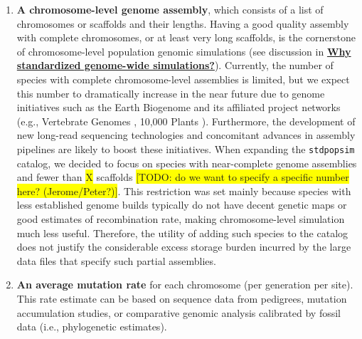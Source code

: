 \documentclass[hidelinks]{article}
\newcommand{\stdpopsim}{\texttt{stdpopsim}\xspace}
\begin{document}
\begin{enumerate}
\def\labelenumi{\arabic{enumi}.}
\item
  \textbf{A chromosome-level genome assembly}, which consists of a list of chromosomes or scaffolds and their lengths. Having a good quality assembly with complete chromosomes, or at least very long scaffolds, is the cornerstone of chromosome-level population genomic simulations (see discussion in \hyperref[sec:std-sim]{\textbf{Why standardized genome-wide simulations?}}). Currently, the number of species with complete chromosome-level assemblies is limited, but we expect this number to dramatically increase in the near future due to genome initiatives such as the Earth Biogenome \citep{Lewin2022} and its affiliated project networks (e.g.,
  Vertebrate Genomes \citep{Rhie2021}, 10,000 Plants \citep{Cheng2018}).
  Furthermore, the development of new long-read sequencing technologies
  \citep{Amarasinghe2020} and concomitant advances in assembly pipelines
  \citep{Chakraborty2016} are likely to boost these initiatives. When expanding the \stdpopsim catalog, we decided to focus on species with near-complete genome assemblies and fewer than \colorbox{yellow}{X} scaffolds %
  \colorbox{yellow}{[TODO: do we want to specify a specific number here? (Jerome/Peter?)]}. This restriction was set mainly because species with less established genome builds typically do not have decent genetic maps or good estimates of recombination rate, making chromosome-level simulation much less useful. Therefore, the utility of adding such species to the catalog does not justify the considerable excess storage burden incurred by the large data files that specify such partial assemblies.




\item
  \textbf{An average mutation rate} for each chromosome (per generation per site).
  This rate estimate can be based on sequence data from pedigrees, mutation accumulation studies, or comparative genomic analysis calibrated by fossil data (i.e., phylogenetic estimates).


\end{enumerate}
\end{document}
